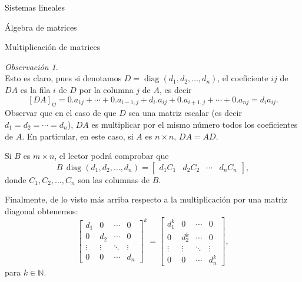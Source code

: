 \documentclass[a4paper,12pt,twoside,spanish,reqno]{amsbook}
\theoremstyle{definition}
\theoremstyle{remark}
\newtheorem{observacion}{Observaci\'on}[section]
\begin{document}
\begin{chapter}{Sistemas lineales}
\begin{section}{Álgebra de matrices}
\begin{subsection}{Multiplicación de matrices}
\begin{observacion}
\begin{equation*}
                \end{equation*}
                Esto es claro, pues si denotamos $D = \operatorname{diag}(d_1,d_2,\ldots,d_n)$, el coeficiente $ij$  de $DA$ es la fila $i$ de $D$ por la columna $j$ de $A$, es decir
                $$
                [DA]_{ij} = 0.a_{1j}+\cdots + 0.a_{i-1,j}+d_i.a_{ij}+0.a_{i+1,j}+\cdots + 0.a_{nj} = d_ia_{ij}. 
                $$
                Observar que en el caso de que $D$ sea una matriz escalar (es decir $d_1=d_2=\cdots=d_n$), $DA$ es multiplicar por el mismo número todos los coeficientes de $A$. En particular, en este caso, si $A$  es $n \times n$,  $DA = AD$.
                 
                
                
                 Si $B$ es $m \times n$, el lector podrá comprobar que 
                 \begin{equation*}
                     B\,\operatorname{diag}(d_1,d_2,\ldots,d_n) = \begin{bmatrix}
                         d_1C_1& d_2C_2& \cdots &d_nC_n
                     \end{bmatrix},
                 \end{equation*} 
                 donde $C_1,C_2,\ldots,C_n$ son las columnas de $B$.
                 
                 Finalmente,  de lo visto más arriba respecto a la multiplicación por una matriz diagonal obtenemos:
                 \begin{equation*}
                    \begin{bmatrix}
                        d_1 & 0 & \cdots &0 \\
                        0 & d_2 & \cdots &0 \\
                        \vdots & \vdots & \ddots &\vdots \\
                        0 & 0 & \cdots & d_n 
                        \end{bmatrix}^k =
                        \begin{bmatrix}
                            d_1^k & 0 & \cdots &0 \\
                            0 & d_2^k & \cdots &0 \\
                            \vdots & \vdots & \ddots &\vdots \\
                            0 & 0 & \cdots & d_n^k 
                            \end{bmatrix} ,
                 \end{equation*}
                 para $k \in \mathbb N$.
                

\end{observacion}
\end{subsection}
\end{section}
\end{chapter}
\end{document}
